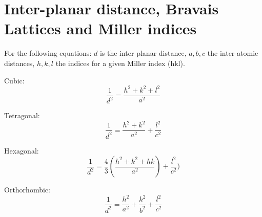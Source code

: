 \documentclass[12pt]{article}
\begin{document}
\section{Inter-planar distance, Bravais Lattices and Miller indices}\label{A:brav_eq}

For the following equations: $d$ is the inter planar distance, $a,b,c$
the inter-atomic distances, $h,k,l$ the indices for a given Miller index (hkl).

Cubic: \[\frac{1}{d^2}=\frac{h^2+k^2+l^2}{a^2}\]

Tetragonal: \[\frac{1}{d^2}=\frac{h^2+k^2}{a^2}+\frac{l^2}{c^2}\]

Hexagonal: \[\frac{1}{d^2}=\frac{4}{3}(\frac{h^2+k^2+hk}{a^2})+\frac{l^2}{c^2})\]

Orthorhombic: \[\frac{1}{d^2}=\frac{h^2}{a^2}+\frac{k^2}{b^2}+\frac{l^2}{c^2}\]
\end{document}
